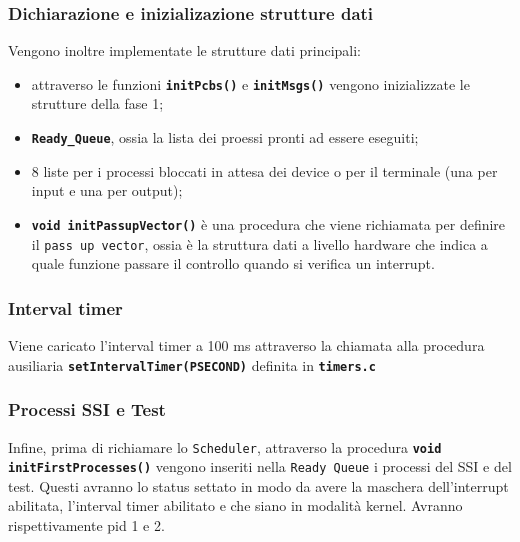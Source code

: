 \documentclass{article}
\begin{document}
\subsubsection{Dichiarazione e inizializazione strutture dati}
Vengono inoltre implementate le strutture dati principali: 
\begin{itemize}
    \item attraverso le funzioni  \texttt{\textbf{initPcbs()}} e \texttt{\textbf{initMsgs()}} vengono inizializzate le strutture della fase 1;
    \item \texttt{\textbf{Ready\_Queue}}, ossia la lista dei proessi pronti ad essere eseguiti;
    \item 8 liste per i processi bloccati in attesa dei device o per il terminale (una per input e una per output);
    \item \texttt{\textbf{void initPassupVector()}} è una procedura che viene richiamata per definire il \texttt{pass up vector}, ossia è la struttura dati a livello hardware che indica a quale funzione passare il controllo quando si verifica un interrupt.
\end{itemize}
\subsubsection{Interval timer}
Viene caricato l'interval timer a 100 ms attraverso la chiamata alla procedura ausiliaria \texttt{\textbf{setIntervalTimer(PSECOND)}} definita in \texttt{\textbf{timers.c}}

\newpage

\subsubsection{Processi SSI e Test}
Infine, prima di richiamare lo \texttt{Scheduler}, attraverso la procedura \texttt{\textbf{void initFirstProcesses()}} vengono inseriti nella \texttt{Ready Queue} i processi del SSI e del test. Questi avranno lo status settato in modo da avere la maschera dell'interrupt abilitata, l'interval timer abilitato e che siano in modalità kernel. Avranno rispettivamente pid 1 e 2.
\end{document}
